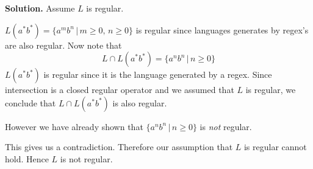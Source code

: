 \textbf{Solution.} Assume $L$ is regular.

$L(a^*b^*) = \{a^mb^n\,|\, m\geq 0, \, n \geq 0\}$ is 
regular since languages generates by regex's are also regular.
Now note that
\[
L \cap L(a^*b^*) = \{a^nb^n \,|\, n \geq 0\}
\]
$L(a^*b^*)$ is regular since it is the language generated by a regex.
Since intersection is a closed regular operator and we assumed that
$L$ is regular, we conclude that $L \cap L(a^*b^*)$ is also regular.

However we have already shown that $\{a^nb^n \,|\, n \geq 0\}$ is
\textit{not} regular.

This gives us a contradiction.
Therefore our assumption that $L$ is regular cannot hold.
Hence $L$ is not regular.






\vspace{0.1in}


\vspace{0.1in}


